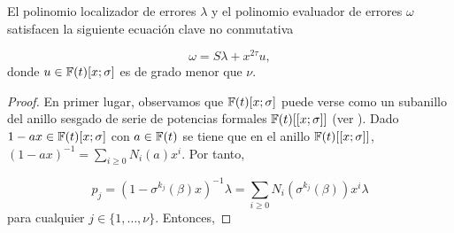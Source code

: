\begin{teorema}
El polinomio localizador de errores $\lambda$ y el polinomio evaluador de errores $\omega$ satisfacen la siguiente ecuación clave no conmutativa

\begin{equation}
    \omega = S\lambda + x^{2\tau}u,
\end{equation}
donde $u \in \mathbb{F}(t)[x;\sigma]$ es de grado menor que $\nu$.
\end{teorema}

\begin{proof}
En primer lugar, observamos que $\mathbb{F}(t)[x;\sigma]$ puede verse como un subanillo del anillo sesgado de serie de potencias formales $\mathbb{F}(t)[[x;\sigma]]$ (ver \cite[Capítulo 1, Sección 4]{mcconnell2001noncommutative}). Dado $1 - ax \in \mathbb{F}(t)[x;\sigma]$ con $a \in \mathbb{F}(t)$ se tiene que en el anillo $\mathbb{F}(t)[[x;\sigma]]$, $(1-ax)^{-1} = \sum_{i \geq 0}N_i(a)x^i$. Por tanto,

$$p_j = (1-\sigma^{k_j}(\beta)x)^{-1}\lambda = \sum_{i \geq 0}N_i(\sigma^{k_j}(\beta))x^{i}\lambda$$ para cualquier $j \in \{1,\dots,\nu\}$. Entonces,


\end{proof}
